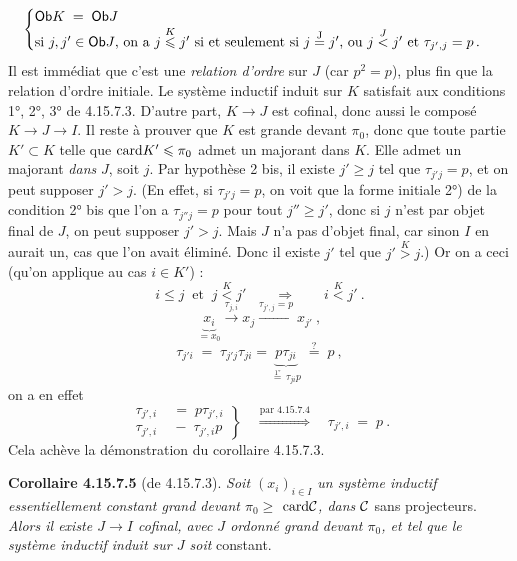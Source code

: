 \[
\begin{cases}
\mathsf{Ob} K \;=\; \mathsf{Ob} J \\
\text{si } j,j' \in \mathsf{Ob} J\text{, on a } j \overset{K}{\leqslant} j' \text{ si et seulement si } j \overset{\mathrm{J}}{=} j'\text{, ou } j \overset{J}{<} j' \text{ et } \tau_{j',j} = p\,.
\end{cases}
\]
Il est immédiat que c'est une \textit{relation d'ordre} sur $J$ (car $p^2 = p$), plus fin que la relation d'ordre initiale. Le système inductif induit sur $K$ satisfait aux conditions 1°, 2°, 3° de 4.15.7.3. D'autre part, $K \longrightarrow J$ est cofinal, donc aussi le composé $K \longrightarrow J \longrightarrow I$. Il reste à prouver que $K$ est grande devant $\pi_0$, donc que toute partie $K' \subset K$ telle que $\mathrm{card} K' \leqslant \pi_0$ admet un majorant dans $K$. Elle admet un majorant \textit{dans} $J$, soit $j$. Par hypothèse 2 bis, il existe $j' \geqslant j$ tel que $\tau_{j'j} = p$, et on peut supposer $j' > j$. (En effet, si $\tau_{j'j} = p$, on voit que
la forme initiale 2°) de la condition 2° bis que l'on a $\tau_{j''j} = p$ pour tout $j'' \geqslant j'$, donc si $j$ n'est par objet final de $J$, %
on peut supposer $j' > j$. Mais $J$ n'a pas d'objet final, car sinon $I$ en aurait un, cas que l'on avait éliminé. Donc il existe $j'$ tel que $j' \overset{K}{>} j$.) Or on a ceci (qu'on applique au cas $i \in K'$) :
\[
i \leqslant j \ \text{ et } \ j \overset{K}{<} j' \qquad \Longrightarrow \qquad i \overset{K}{<} j'\ .
\]
\[
\underbrace{x_i}_{= x_0} \xrightarrow{\tau_{j,i}} x_j \xrightarrow{\tau_{j',j}=p} x_{j'}\ ,
\]
\[
\tau_{j'i} \;=\; \tau_{j'j}\tau_{ji} = \underbrace{p\tau_{ji}}_{\overset{\text{1°}}{=}\,\tau_{ji}p} \;\overset{?}{=}\; p\ ,
\]
on a en effet
\[
\left.
\begin{aligned}
\tau_{j',i} &\;=\; p\tau_{j',i} \\
\tau_{j',i} &\;-\; \tau_{j',i}p %
\end{aligned}
\right\}
\quad \overset{\text{par 4.15.7.4}}{\Longrightarrow} \quad %
\tau_{j',i} \;=\; p\ .
\]
Cela achève la démonstration du corollaire 4.15.7.3.

\textbf{Corollaire 4.15.7.5} (de 4.15.7.3). \textit{Soit $(x_i)_{i\in I}$ un système inductif essentiellement constant grand devant $\pi_0 \geqslant$} $\mathrm{card}\mathcal{C}$\textit{, dans $\mathcal{C}$} sans projecteurs. \textit{Alors il existe $J \longrightarrow I$ cofinal, avec $J$ ordonné grand devant $\pi_0$, et tel que le système inductif induit sur $J$ soit} constant.

